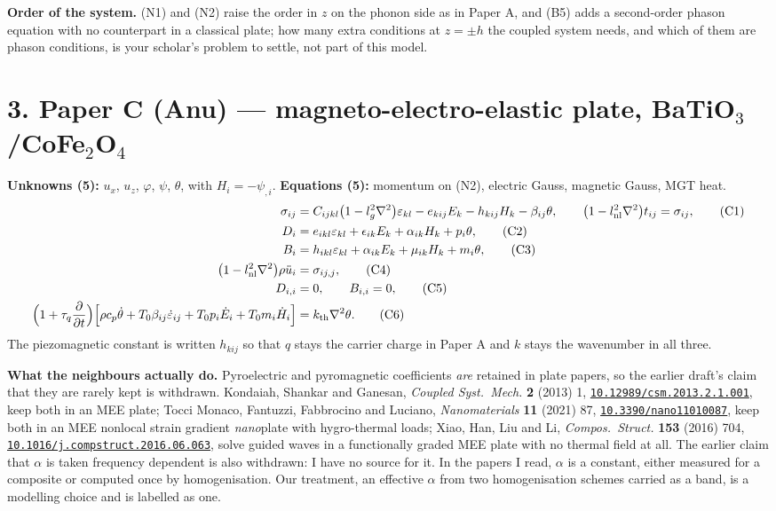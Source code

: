 \documentclass[11pt]{article}
\newcommand{\doi}[1]{\href{https://doi.org/#1}{\texttt{#1}}}
\begin{document}
\noindent\textbf{Order of the system.} (N1) and (N2) raise the order in $z$ on the phonon side as in
Paper A, and (B5) adds a second-order phason equation with no counterpart in a classical plate; how many
extra conditions at $z=\pm h$ the coupled system needs, and which of them are phason conditions, is your
scholar's problem to settle, not part of this model.

\section*{3. Paper C (Anu) --- magneto-electro-elastic plate, BaTiO$_3$/CoFe$_2$O$_4$}

\noindent\textbf{Unknowns (5):} $u_x$, $u_z$, $\varphi$, $\psi$, $\theta$, with $H_i=-\psi_{,i}$. \quad
\textbf{Equations (5):} momentum on (N2), electric Gauss, magnetic Gauss, MGT heat.
\begin{align}
\sigma_{ij}&=C_{ijkl}\bigl(1-l_g^2\nabla^2\bigr)\varepsilon_{kl}-e_{kij}E_k-h_{kij}H_k-\beta_{ij}\theta,
\qquad \bigl(1-l_{\rm nl}^2\nabla^2\bigr)t_{ij}=\sigma_{ij}, \tag{C1}\\
D_i&=e_{ikl}\varepsilon_{kl}+\epsilon_{ik}E_k+\alpha_{ik}H_k+p_i\theta, \tag{C2}\\
B_i&=h_{ikl}\varepsilon_{kl}+\alpha_{ik}E_k+\mu_{ik}H_k+m_i\theta, \tag{C3}\\
\bigl(1-l_{\rm nl}^2\nabla^2\bigr)\rho\ddot u_i&=\sigma_{ij,j}, \tag{C4}\\
D_{i,i}&=0,\qquad B_{i,i}=0, \tag{C5}\\
\Bigl(1+\tau_q\frac{\partial}{\partial t}\Bigr)
\Bigl[\rho c_p\dot\theta+T_0\beta_{ij}\dot\varepsilon_{ij}
+T_0p_i\dot E_i+T_0m_i\dot H_i\Bigr]&=k_{\rm th}\nabla^2\theta . \tag{C6}
\end{align}
The piezomagnetic constant is written $h_{kij}$ so that $q$ stays the carrier charge in Paper A and $k$
stays the wavenumber in all three.

\noindent\textbf{What the neighbours actually do.} Pyroelectric and pyromagnetic coefficients \emph{are}
retained in plate papers, so the earlier draft's claim that they are rarely kept is withdrawn. Kondaiah,
Shankar and Ganesan, \emph{Coupled Syst.\ Mech.} \textbf{2} (2013) 1, \doi{10.12989/csm.2013.2.1.001},
keep both in an MEE plate; Tocci Monaco, Fantuzzi, Fabbrocino and Luciano, \emph{Nanomaterials}
\textbf{11} (2021) 87, \doi{10.3390/nano11010087}, keep both in an MEE nonlocal strain gradient \emph{nano}plate
with hygro-thermal loads; Xiao, Han, Liu and Li, \emph{Compos.\ Struct.} \textbf{153} (2016) 704,
\doi{10.1016/j.compstruct.2016.06.063}, solve guided waves in a functionally graded MEE plate with no
thermal field at all. The earlier claim that $\alpha$ is taken frequency dependent is also withdrawn: I
have no source for it. In the papers I read, $\alpha$ is a constant, either measured for a composite or
computed once by homogenisation. Our treatment, an effective $\alpha$ from two homogenisation schemes
carried as a band, is a modelling choice and is labelled as one.
\end{document}
